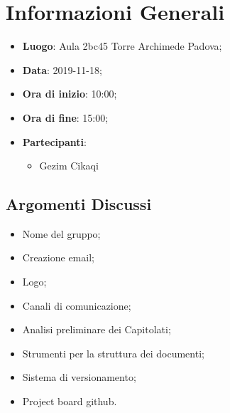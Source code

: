 \section{Informazioni Generali}
	\begin{itemize}
		\item \textbf {Luogo}: Aula 2bc45 Torre Archimede Padova;
		\item \textbf {Data}: 2019-11-18;
		\item \textbf {Ora di inizio}: 10:00;
		\item \textbf {Ora di fine}: 15:00;
		\item \textbf {Partecipanti}: 
			\begin{itemize}
				\item Gezim Cikaqi
				
			\end{itemize}
	\end{itemize}
\subsection{Argomenti Discussi}
	\begin{itemize}
		\item Nome del gruppo;
		\item Creazione email;
		\item Logo;
		\item Canali di comunicazione;
		\item Analisi preliminare dei Capitolati\glos;
		\item Strumenti per la struttura dei documenti;
		\item Sistema di versionamento;
		\item Project board github.
	\end{itemize}